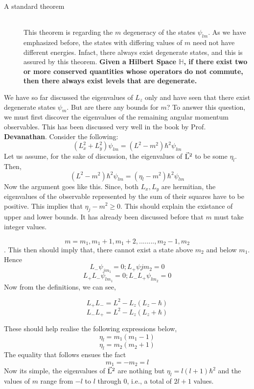 \documentclass[12pt]{article}
\begin{document}
\begin{description}
\item[A standard theorem] \hfill \\
	This theorem is regarding the $m$ degeneracy of the states $\psi_{lm}$. As we have emphasized before, the states with differing values of $m$ need not have different energies. Infact, there always exist degenerate states, and this is assured by this theorem. \textbf{Given a Hilbert Space $\mathbb{H}$, if there exist two or more conserved quantities whose operators do not commute, then there always exist levels that are degenerate.} 
\end{description}
We have so far discussed the eigenvalues of $L_z$ only and have seen that there exist degenerate states $\psi_m$. But are there any bounds for $m$? To answer this question, we must first discover the eigenvalues of the remaining angular momentum observables. This has been discussed very well in the book by Prof. \textbf{Devanathan}. Consider the following:
$$(L_x^2 + L_y^2)\psi_{lm} = (L^2 - m^2)\hbar^2 \psi_{lm}$$
Let us assume, for the sake of discussion, the eigenvalues of \textbf{$\vec{\mathrm{L}}^2$} to be some $\eta_l$. Then,
$$ (L^2 - m^2)\hbar^2 \psi_{lm} = (\eta_l - m^2)\hbar^2\psi_{lm}$$
Now the argument goes like this. Since, both $L_x, L_y$ are hermitian, the eigenvalues of the observable represented by the sum of their squares have to be positive. This implies that $\eta_j - m^2 \geq 0$. This should explain the existance of upper and lower bounds. It has already been discussed before that $m$ must take integer values.

$$m = m_1, m_1 + 1, m_1 + 2, ........, m_2 - 1,m_2$$.
This then should imply that, there cannot exist a state above $m_2$ and below $m_1$. Hence $$L_-\psi_{jm_1} = 0; L_+\psi{jm_2} = 0$$
$$L_+L_-\psi_{lm_1} = 0; L_-L_+\psi_{lm_2}=0$$
Now from the definitions, we can see,

$$L_+L_- = L^2 - L_z(L_z - \hbar)$$
$$L_-L_+ = L^2 - L_z(L_z +\hbar)$$

These should help realise the following expressions below,
$$\eta_l = m_1(m_1-1)$$
$$\eta_l = m_2(m_2+1)$$
The equality that follows ensues the fact $$m_1 = -m_2 = l$$ Now its simple, the eigenvalues of \textbf{$\vec{\mathrm{L}}^2$} are nothing but $\eta_l = l(l+1)\hbar^2$ and the values of $m$ range from $-l$ to $l$ through 0, i.e., a total of $2l+1$ values.
\end{document}
